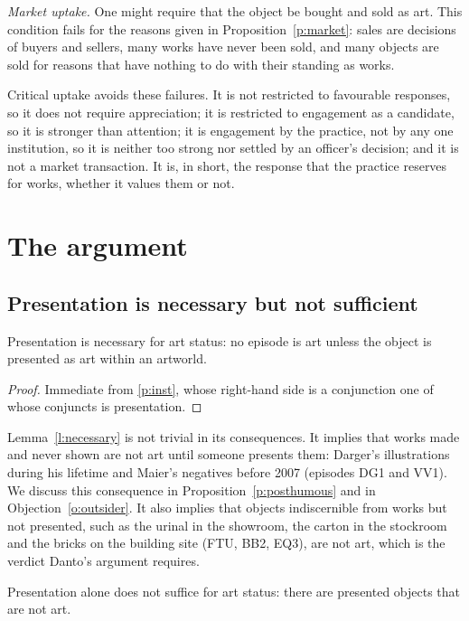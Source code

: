 \documentclass{situationist-preprint}
\begin{document}
\emph{Market uptake.} One might require that the object be bought and sold as art. This condition fails for the reasons given in Proposition~\ref{p:market}: sales are decisions of buyers and sellers, many works have never been sold, and many objects are sold for reasons that have nothing to do with their standing as works.

Critical uptake avoids these failures. It is not restricted to favourable responses, so it does not require appreciation; it is restricted to engagement as a candidate, so it is stronger than attention; it is engagement by the practice, not by any one institution, so it is neither too strong nor settled by an officer's decision; and it is not a market transaction. It is, in short, the response that the practice reserves for works, whether it values them or not.

\section{The argument}\label{s:argument}

\subsection{Presentation is necessary but not sufficient}

\begin{lemma}\label{l:necessary}
Presentation is necessary for art status: no episode is art unless the object is presented as art within an artworld.
\end{lemma}

\begin{proof}
Immediate from \ref{p:inst}, whose right-hand side is a conjunction one of whose conjuncts is presentation.
\end{proof}

Lemma~\ref{l:necessary} is not trivial in its consequences. It implies that works made and never shown are not art until someone presents them: Darger's illustrations during his lifetime and Maier's negatives before 2007 (episodes DG1 and VV1). We discuss this consequence in Proposition~\ref{p:posthumous} and in Objection~\ref{o:outsider}. It also implies that objects indiscernible from works but not presented, such as the urinal in the showroom, the carton in the stockroom and the bricks on the building site (FTU, BB2, EQ3), are not art, which is the verdict Danto's argument requires.

\begin{theorem}\label{t:insufficient}
Presentation alone does not suffice for art status: there are presented objects that are not art.
\end{theorem}
\end{document}
